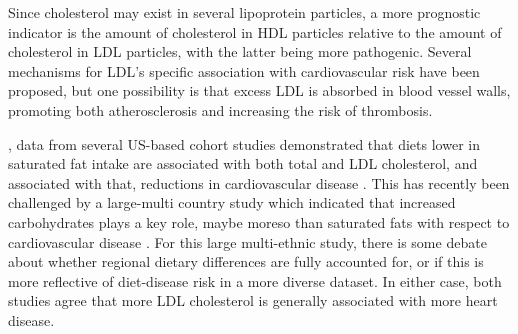 \documentclass{tufte-handout}
\begin{document}
Since cholesterol may exist in several lipoprotein particles, a more prognostic indicator is the amount of cholesterol in HDL particles relative to the amount of cholesterol in LDL particles, with the latter being more pathogenic.  Several mechanisms for LDL's specific association with cardiovascular risk have been proposed, but one possibility is that excess LDL is absorbed in blood vessel walls, promoting both atherosclerosis and increasing the risk of thrombosis.

, data from several US-based cohort studies demonstrated that diets lower in saturated fat intake are associated with both total and LDL cholesterol, and associated with that, reductions in cardiovascular disease \citep{Anderson1987,Wang2016b}.  This has recently been challenged by a large-multi country study which indicated that increased carbohydrates plays a key role, maybe moreso than saturated fats with respect to cardiovascular disease \citep{Dehghan2017}.  For this large multi-ethnic study, there is some debate about whether regional dietary differences are fully accounted for, or if this is more reflective of diet-disease risk in a more diverse dataset.  In either case, both studies agree that more LDL cholesterol is generally associated with more heart disease.



\end{document}
